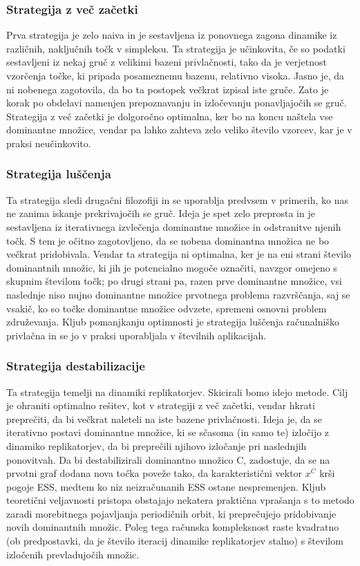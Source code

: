 \documentclass[a4paper]{article}
\begin{document}
\subsubsection{Strategija z več začetki} Prva strategija je zelo naiva in je sestavljena iz ponovnega zagona dinamike iz različnih, naključnih točk v simpleksu. Ta strategija je učinkovita, če so podatki sestavljeni iz nekaj gruč z velikimi bazeni privlačnosti, tako da je verjetnost vzorčenja točke, ki pripada posameznemu bazenu, relativno visoka. Jasno je, da ni nobenega zagotovila, da bo ta postopek večkrat izpisal iste gruče. Zato je korak po obdelavi namenjen prepoznavanju in izločevanju ponavljajočih se gruč. Strategija z več začetki je dolgoročno optimalna, ker bo na koncu naštela vse dominantne množice, vendar pa lahko zahteva zelo veliko število vzorcev, kar je v praksi neučinkovito.

\subsubsection{Strategija luščenja} Ta strategija sledi drugačni filozofiji in se uporablja predvsem v primerih, ko nas ne zanima iskanje prekrivajočih se gruč. Ideja je spet zelo preprosta in je sestavljena iz iterativnega izvlečenja dominantne množice in odstranitve njenih točk. S tem je očitno zagotovljeno, da se nobena dominantna množica ne bo večkrat pridobivala. Vendar ta strategija ni optimalna, ker je na eni strani število dominantnih množic, ki jih je potencialno mogoče označiti, navzgor omejeno s skupnim številom točk; po drugi strani pa, razen prve dominantne množice, vsi naslednje niso nujno dominantne množice prvotnega problema razvrščanja, saj se vsakič, ko so točke dominantne množice odvzete, spremeni osnovni problem združevanja. Kljub pomanjkanju optimnosti je strategija luščenja računalniško privlačna in se jo v praksi uporabljala v številnih aplikacijah.

\subsubsection{Strategija destabilizacije} Ta strategija temelji na dinamiki replikatorjev. Skicirali bomo idejo metode. Cilj je ohraniti optimalno rešitev, kot v strategiji z več začetki, vendar hkrati preprečiti, da bi večkrat naleteli na iste bazene privlačnosti. Ideja je, da se iterativno postavi dominantne množice, ki se sčasoma (in samo te) izločijo z dinamiko replikatorjev, da bi preprečili njihovo izločanje pri naslednjih ponovitvah. Da bi destabilizirali dominantno množico C, zadostuje, da se na prvotni graf dodana nova točka poveže tako, da karakteristični vektor $x^C$ krši pogoje ESS, medtem ko niz neizračunanih ESS ostane nespremenjen. Kljub teoretični veljavnosti pristopa obstajajo nekatera praktična vprašanja s to metodo zaradi morebitnega pojavljanja periodičnih orbit, ki preprečujejo pridobivanje novih dominantnih množic. Poleg tega računska kompleksnost raste kvadratno (ob predpostavki, da je število iteracij dinamike replikatorjev stalno) s številom izločenih prevladujočih množic.
\end{document}
